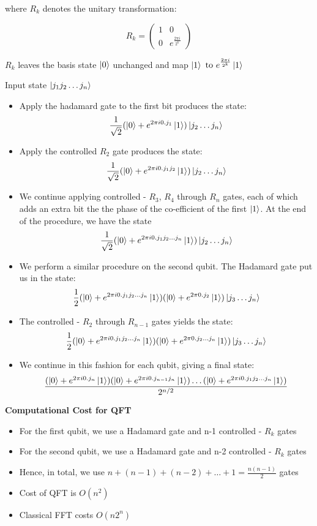 \documentclass[12pt]{article}
\begin{document}
where $R_{k}$ denotes the unitary transformation:

\[
R_{k} = 
\begin{pmatrix}
1 & 0 \\
0 & e^{\frac{2 \pi i}{2^k}}
\end{pmatrix}
\]

$R_{k}$ leaves the basis state $\ket{0}$ unchanged and map $\ket{1} \text{ to } e^{\frac{2 \pi i}{2^k}} \ket{1}$

Input state $\ket{j_{1} j_{2} \dots j_{n}}$
\begin{itemize}
\item Apply the hadamard gate to the first bit produces the state: 
$$
\frac{1}{\sqrt{2}}(\ket{0} + e^{2 \pi i 0.j_{1}} \ket{1}) \ket{j_{2} \dots j_{n}}
$$
\item Apply the controlled $R_{2}$ gate produces the state: 
$$
\frac{1}{\sqrt{2}}(\ket{0} + e^{2 \pi i 0.j_{1}j_{2}} \ket{1}) \ket{j_{2} \dots j_{n}}
$$
\item We continue applying controlled -  $R_{3}$, $R_{4}$ through $R_{n}$ gates, each of which adds an extra bit the the phase of the co-efficient of the first $\ket{1}$. At the end of the procedure, we have the state
$$
\frac{1}{\sqrt{2}}(\ket{0} + e^{2 \pi i 0.j_{1}j_{2} \dots j_{n}} \ket{1}) \ket{j_{2} \dots j_{n}}
$$

\item We perform a similar procedure on the second qubit. The Hadamard gate put us in the state:
$$
\frac{1}{2}(\ket{0} + e^{2 \pi i 0.j_{1}j_{2} \dots j_{n}} \ket{1})(\ket{0} + e^{2 \pi 0.j_{2}} \ket{1}) \ket{j_{3} \dots j_{n}}
$$
\item The controlled - $R_{2} \text{ through } R_{n-1}$ gates yields the state:
$$
\frac{1}{2}(\ket{0} + e^{2 \pi i 0.j_{1}j_{2} \dots j_{n}} \ket{1})(\ket{0} + e^{2 \pi 0.j_{2} \dots j_{n}} \ket{1}) \ket{j_{3} \dots j_{n}}
$$
\item We continue in this fashion for each qubit, giving a final state:
$$
\frac{(\ket{0} + e^{2 \pi i 0.j_{n}} \ket{1})(\ket{0} + e^{2 \pi i 0.j_{n-1}j_{n}} \ket{1}) \dots (\ket{0} + e^{2 \pi i 0.j_{1}j_{2} \dots j_{n}} \ket{1})}{2^{n/2}}
$$
\end{itemize}

\textbf{Computational Cost for QFT}
\begin{itemize}
\item For the first qubit, we use a Hadamard gate and n-1 controlled - $R_{k}$ gates
\item For the second qubit, we use a Hadamard gate and n-2 controlled - $R_{k}$ gates
\item Hence, in total, we use $n + (n-1) + (n-2) + \dots + 1 = \frac{n(n-1)}{2}$ gates
\item Cost of QFT is $O(n^2)$
\item Classical FFT costs $O(n2^n)$
\end{itemize}
\end{document}
